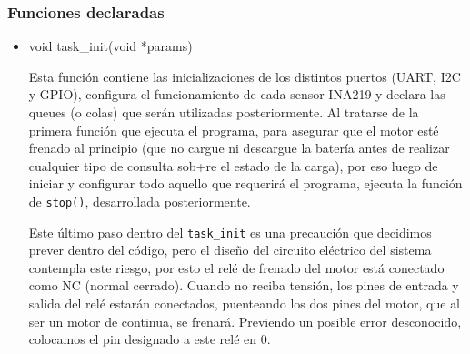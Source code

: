                     

                \subsubsection{Funciones declaradas}
                
                \begin{itemize} [label = ·]
                \setlength{\itemindent}{1.5em}
                
                    \item void task\_init(void *params)\par
                        Esta función contiene las inicializaciones de los distintos puertos (UART, I2C y GPIO), configura el funcionamiento de cada sensor INA219 y declara las queues (o colas) que serán utilizadas posteriormente. Al tratarse de la primera función que ejecuta el programa, para asegurar que el motor esté frenado al principio (que no cargue ni descargue la batería antes de realizar cualquier tipo de consulta sob+re el estado de la carga), por eso luego de iniciar y configurar todo aquello que requerirá el programa, ejecuta la función de \texttt{stop()}, desarrollada posteriormente.\par
                        Este último paso dentro del \texttt{task\_init} es una precaución que decidimos prever dentro del código, pero el diseño del circuito eléctrico del sistema contempla este riesgo, por esto el relé de frenado del motor está conectado como NC (normal cerrado). Cuando no reciba tensión, los pines de entrada y salida del relé estarán conectados, puenteando los dos pines del motor, que al ser un motor de continua, se frenará. Previendo un posible error desconocido, colocamos el pin designado a este relé en 0.\par
                        
                \end{itemize}

